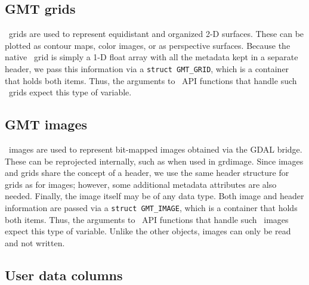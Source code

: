 \documentclass[11pt]{report}
\begin{document}
\subsection{GMT grids}

\GMT\ grids are used to represent equidistant and organized 2-D surfaces.  These can be
plotted as contour maps, color images, or as perspective surfaces.  Because the native
\GMT\ grid is simply a 1-D float array with all the metadata kept in a separate header, we
pass this information via a \texttt{struct GMT\_GRID}, which is a container that holds both items.
Thus, the arguments to \GMT\ API functions that handle such \GMT\ grids expect this type
of variable.

\subsection{GMT images}

\GMT\ images are used to represent bit-mapped images obtained via the GDAL bridge.  These can be
reprojected internally, such as when used in grdimage.  Since images and grids share the concept
of a header, we use the same header structure for grids as for images; however, some additional
metadata attributes are also needed.  Finally, the image itself may be of any data type.
Both image and header information are passed via a \texttt{struct GMT\_IMAGE}, which is a container that holds both items.
Thus, the arguments to \GMT\ API functions that handle such \GMT\ images expect this type
of variable.  Unlike the other objects, images can only be read and not written.

\subsection{User data columns}
\end{document}
